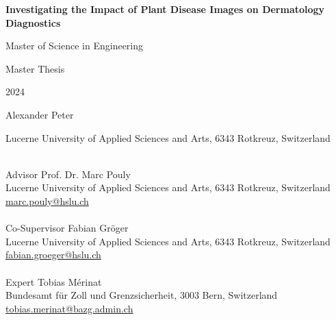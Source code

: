 \begin{center}

\vspace*{3cm}
\Huge
\textbf{Investigating the Impact of Plant Disease Images on Dermatology Diagnostics}

\vspace*{1cm}
\LARGE
Master of Science in Engineering\par
Master Thesis\par
2024

\vspace{0.5cm}
Alexander Peter

\vspace*{1cm}
\large
Lucerne University of Applied Sciences and Arts, 6343 Rotkreuz, Switzerland

\end{center}

\vspace*{4cm}
\normalsize
\begin{tabbing}
\phantom{Co-Supervisor } \= \\ %
Advisor \> Prof. Dr. Marc Pouly \\
		\> Lucerne University of Applied Sciences and Arts, 6343 Rotkreuz, Switzerland \\
\> \href{mailto:marc.pouly@hslu.ch}{marc.pouly@hslu.ch} \\
\\
Co-Supervisor \> Fabian Gröger \\
		\> Lucerne University of Applied Sciences and Arts, 6343 Rotkreuz, Switzerland \\
\> \href{mailto:fabian.groeger@hslu.ch}{fabian.groeger@hslu.ch} \\
\\
Expert \> Tobias Mérinat \\
\> Bundesamt für Zoll und Grenzsicherheit, 3003 Bern, Switzerland \\
\> \href{mailto:tobias.merinat@bazg.admin.ch}{tobias.merinat@bazg.admin.ch} \\
\end{tabbing}

\newpage
